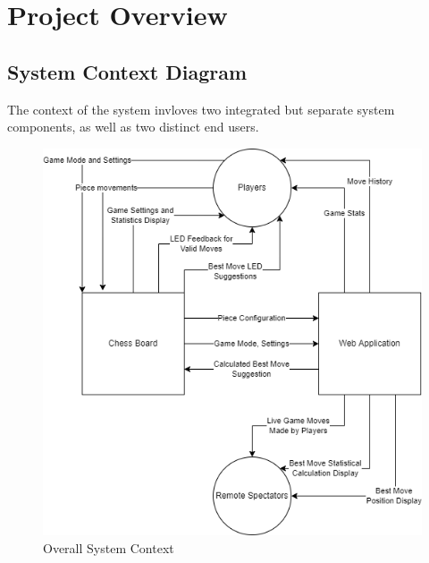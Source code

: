 \documentclass[12pt]{article}
\begin{document}
\section{Project Overview}
\subsection{System Context Diagram}{

    The context of the system invloves two integrated but separate system components, as well as two distinct end users.

\begin{figure}[H]
  \begin{center}
    \includegraphics[scale=0.65]{chess-connect-system-context.png}
    \caption{Overall System Context}
    \label{Fig_SystemContext} 
  \end{center}
\end{figure}

}
\end{document}
